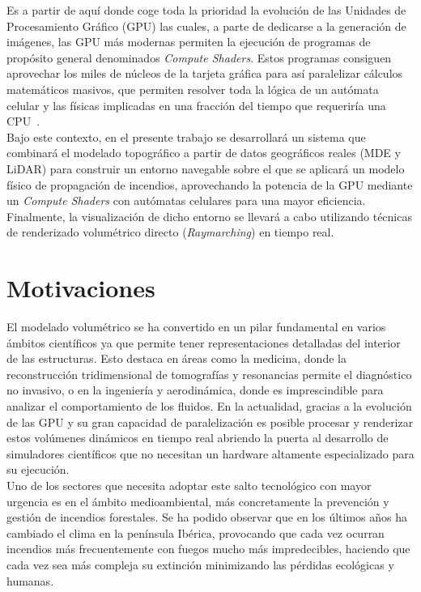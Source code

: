 Es a partir de aquí donde coge toda la prioridad la evolución de las Unidades de Procesamiento Gráfico (GPU) las cuales, a parte de  dedicarse a la generación de imágenes, las GPU más modernas permiten la ejecución de programas de propósito general denominados \textit{Compute Shaders}. Estos programas consiguen aprovechar los miles de núcleos de la tarjeta gráfica para así paralelizar cálculos matemáticos masivos, que  permiten resolver toda la lógica de un autómata celular y las físicas implicadas en una fracción del tiempo que requeriría una CPU~\cite{gpugems_ch38, gpugems3_ch30}.\\

Bajo este contexto, en el presente trabajo se desarrollará un sistema que combinará el modelado topográfico a partir de datos geográficos reales (MDE y LiDAR) para construir un entorno navegable sobre el que se aplicará un modelo físico de propagación de incendios, aprovechando la potencia de la GPU mediante un \textit{Compute Shaders} con autómatas celulares para una mayor eficiencia. Finalmente, la visualización de dicho entorno se llevará a cabo utilizando técnicas de renderizado volumétrico directo (\textit{Raymarching}) en tiempo real.\\


\clearpage

\section{Motivaciones}
El modelado volumétrico se ha convertido en un pilar fundamental en varios ámbitos científicos ya que permite tener representaciones detalladas del interior de las estructuras. Esto destaca en áreas como la medicina, donde la reconstrucción tridimensional de tomografías y resonancias permite el diagnóstico no invasivo, o en la ingeniería y aerodinámica, donde es imprescindible para analizar el comportamiento de los fluidos. En la actualidad, gracias a la evolución de las GPU y su gran capacidad de paralelización es posible procesar y renderizar estos volúmenes dinámicos en tiempo real abriendo la puerta al desarrollo de simuladores científicos que no necesitan un hardware altamente especializado para su ejecución.\\ 

Uno de los sectores que necesita adoptar este salto tecnológico con mayor urgencia es en el ámbito medioambiental, más concretamente la prevención y gestión de incendios forestales. Se ha podido observar que en los últimos años ha cambiado el clima en la península Ibérica, provocando que cada vez ocurran incendios más frecuentemente con  fuegos mucho más impredecibles, haciendo que cada vez sea más compleja su extinción minimizando las pérdidas ecológicas y humanas.\\  

